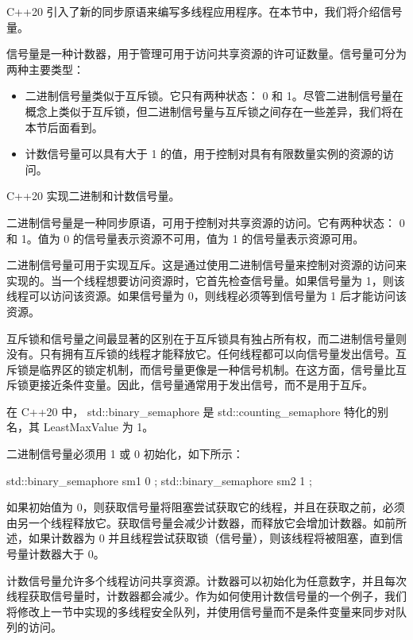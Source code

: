 
C++20 引入了新的同步原语来编写多线程应用程序。在本节中，我们将介绍信号量。

信号量是一种计数器，用于管理可用于访问共享资源的许可证数量。信号量可分为两种主要类型：

\begin{itemize}
\item
二进制信号量类似于互斥锁。它只有两种状态： 0 和 1。尽管二进制信号量在概念上类似于互斥锁，但二进制信号量与互斥锁之间存在一些差异，我们将在本节后面看到。

\item
计数信号量可以具有大于 1 的值，用于控制对具有有限数量实例的资源的访问。
\end{itemize}

C++20 实现二进制和计数信号量。


二进制信号量是一种同步原语，可用于控制对共享资源的访问。它有两种状态： 0 和 1。值为 0 的信号量表示资源不可用，值为 1 的信号量表示资源可用。

二进制信号量可用于实现互斥。这是通过使用二进制信号量来控制对资源的访问来实现的。当一个线程想要访问资源时，它首先检查信号量。如果信号量为 1，则该线程可以访问该资源。如果信号量为 0，则线程必须等到信号量为 1 后才能访问该资源。

互斥锁和信号量之间最显著的区别在于互斥锁具有独占所有权，而二进制信号量则没有。只有拥有互斥锁的线程才能释放它。任何线程都可以向信号量发出信号。互斥锁是临界区的锁定机制，而信号量更像是一种信号机制。在这方面，信号量比互斥锁更接近条件变量。因此，信号量通常用于发出信号，而不是用于互斥。

在 C++20 中， std::binary\_semaphore 是 std::counting\_semaphore 特化的别名，其 LeastMaxValue 为 1。

二进制信号量必须用 1 或 0 初始化，如下所示：

\begin{cpp}
std::binary_semaphore sm1{ 0 };
std::binary_semaphore sm2{ 1 };
\end{cpp}

如果初始值为 0，则获取信号量将阻塞尝试获取它的线程，并且在获取之前，必须由另一个线程释放它。获取信号量会减少计数器，而释放它会增加计数器。如前所述，如果计数器为 0 并且线程尝试获取锁（信号量），则该线程将被阻塞，直到信号量计数器大于 0。


计数信号量允许多个线程访问共享资源。计数器可以初始化为任意数字，并且每次线程获取信号量时，计数器都会减少。作为如何使用计数信号量的一个例子，我们将修改上一节中实现的多线程安全队列，并使用信号量而不是条件变量来同步对队列的访问。

